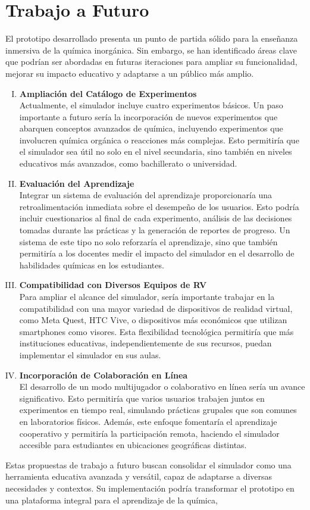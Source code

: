 \chapter{Trabajo a Futuro}\label{ch:Trabajo_Futuro}
El prototipo desarrollado presenta un punto de partida sólido para la enseñanza inmersiva de la química inorgánica. Sin embargo, se han identificado áreas clave que podrían ser abordadas en futuras iteraciones para ampliar su funcionalidad, mejorar su impacto educativo y adaptarse a un público más amplio.
\begin{enumerate}[I.]
    \item \textbf{Ampliación del Catálogo de Experimentos}\\
    Actualmente, el simulador incluye cuatro experimentos básicos. Un paso importante a futuro sería la incorporación de nuevos experimentos que abarquen conceptos avanzados de química, incluyendo experimentos que involucren química orgánica o reacciones más complejas. Esto permitiría que el simulador sea útil no solo en el nivel secundaria, sino también en niveles educativos más avanzados, como bachillerato o universidad.
    \item \textbf{Evaluación del Aprendizaje}\\
    Integrar un sistema de evaluación del aprendizaje proporcionaría una retroalimentación inmediata sobre el desempeño de los usuarios. Esto podría incluir cuestionarios al final de cada experimento, análisis de las decisiones tomadas durante las prácticas y la generación de reportes de progreso. Un sistema de este tipo no solo reforzaría el aprendizaje, sino que también permitiría a los docentes medir el impacto del simulador en el desarrollo de habilidades químicas en los estudiantes.
    \item \textbf{Compatibilidad con Diversos Equipos de RV}\\
    Para ampliar el alcance del simulador, sería importante trabajar en la compatibilidad con una mayor variedad de dispositivos de realidad virtual, como Meta Quest, HTC Vive, o dispositivos más económicos que utilizan smartphones como visores. Esta flexibilidad tecnológica permitiría que más instituciones educativas, independientemente de sus recursos, puedan implementar el simulador en sus aulas.
    \item \textbf{Incorporación de Colaboración en Línea}\\
    El desarrollo de un modo multijugador o colaborativo en línea sería un avance significativo. Esto permitiría que varios usuarios trabajen juntos en experimentos en tiempo real, simulando prácticas grupales que son comunes en laboratorios físicos. Además, este enfoque fomentaría el aprendizaje cooperativo y permitiría la participación remota, haciendo el simulador accesible para estudiantes en ubicaciones geográficas distintas.
\end{enumerate}
Estas propuestas de trabajo a futuro buscan consolidar el simulador como una herramienta educativa avanzada y versátil, capaz de adaptarse a diversas necesidades y contextos. Su implementación podría transformar el prototipo en una plataforma integral para el aprendizaje de la química, 